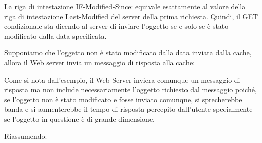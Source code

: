 \documentclass{book}
\begin{document}
\begin{example}
  La riga di intestazione IF-Modified-Since: equivale esattamente al valore
  della riga di intestazione Last-Modified del server della prima richiesta.
  Quindi, il GET condizionale sta dicendo al server di inviare l'oggetto se e
  solo se {\`e} stato modificato dalla data specificata.
  
  Supponiamo che l'oggetto non {\`e} stato modificato dalla data inviata dalla
  cache, allora il Web server invia un messaggio di risposta alla cache:
  
  {}
\end{example}

Come si nota dall'esempio, il Web Server inviera comunque un messaggio di
risposta ma non include necessariamente l'oggetto richiesto dal messaggio
poich{\'e}, se l'oggetto non {\`e} stato modificato e fosse inviato comunque,
si sprecherebbe banda e si aumenterebbe il tempo di risposta percepito
dall'utente specialmente se l'oggetto in questione {\`e} di grande dimensione.

Riassumendo:

{}
\end{document}

